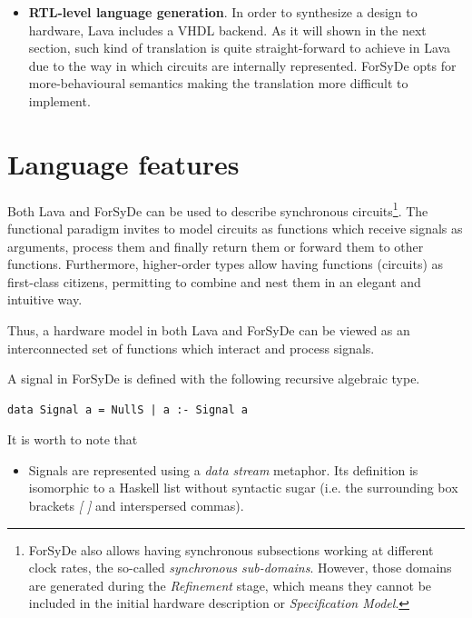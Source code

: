 \documentclass[a4paper,twoside,11pt]{article}
\begin{document}
\begin{body}
\begin{itemize}
\item \textbf{RTL-level language generation}. In order to synthesize a
  design to hardware, Lava includes a VHDL backend. As it will shown in
  the next section, such kind of translation is quite straight-forward
  to achieve in Lava due to the way in which circuits are
  internally represented. ForSyDe opts for more-behavioural semantics
  making the translation more difficult to implement.
  
\end{itemize}

\section{Language features}

Both Lava and ForSyDe can be used to describe synchronous
circuits\footnote{ForSyDe also allows having synchronous subsections
  working at different clock rates, the so-called \textit{synchronous
    sub-domains}. However, those domains are generated during the
  \textit{Refinement} stage, which means they cannot be included in
  the initial hardware description or \textit{Specification Model}.}.
The functional paradigm invites to model circuits as functions which
receive signals as arguments, process them and finally return them or
forward them to other functions.  Furthermore, higher-order types
allow having functions (circuits) as first-class citizens, permitting
to combine and nest them in an elegant and intuitive way.

Thus, a hardware model in both Lava and ForSyDe can be viewed as an
interconnected set of functions which interact and process signals.

A signal in ForSyDe is defined with the following recursive algebraic type.

\begin{lstlisting}
data Signal a = NullS | a :- Signal a
\end{lstlisting}

It is worth to note that 

\begin{itemize}

\item Signals are represented using a \textit{data stream} metaphor.
  Its definition is isomorphic to a Haskell list without syntactic
  sugar (i.e. the surrounding box brackets \textit{[ ]} and
  interspersed commas).


\end{itemize}
\end{body}
\end{document}
